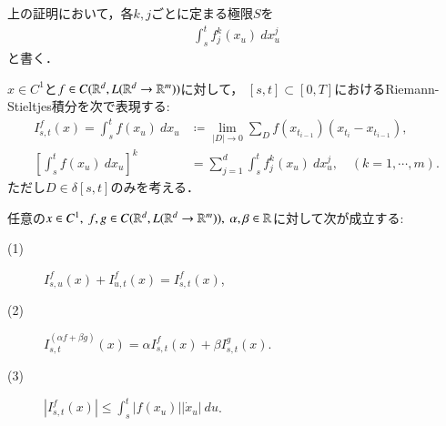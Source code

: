 上の証明において，各$k,j$ごとに定まる極限$S$を
\begin{align}
	\int_s^t f^k_j(x_u)\ dx^j_u
\end{align}
と書く．

\begin{screen}
	\begin{dfn}[$C^1$-級のパスに対する汎関数]
		$x \in C^1$と$f \in C(\mathbb{R}^d,L(\mathbb{R}^d \rightarrow \mathbb{R}^m))$に対して，
		$[s,t] \subset [0,T]$におけるRiemann-Stieltjes積分を次で表現する:
		\begin{align}
			I^f_{s,t}(x) = \int_s^t f(x_u)\ dx_u 
			&\coloneqq \lim_{|D| \to 0}
				\sum_{D} f(x_{t_{i-1}})(x_{t_i} - x_{t_{i-1}}), \\
			\left[ \int_s^t f(x_u)\ dx_u \right]^k
			&= \sum_{j=1}^d \int_s^t f^k_j(x_u)\ dx^j_u,
			\quad (k = 1,\cdots,m).
		\end{align}
		ただし$D \in \delta[s,t]$のみを考える．
	\end{dfn}
\end{screen}

\begin{screen}
	\begin{thm}
	\label{thm:linearity_of_Riemann_Stieltjes_integral}
		任意の$x \in C^1,\ f,g \in C(\mathbb{R}^d,L(\mathbb{R}^d \rightarrow \mathbb{R}^m)),\ \alpha,\beta \in \mathbb{R}$に対して次が成立する:
		\begin{description}
			\item[(1)] $I^f_{s,u}(x) + I^f_{u,t}(x) = I^f_{s,t}(x)$,
			
			\item[(2)] $I^{(\alpha f + \beta g)}_{s,t}(x) = \alpha I^f_{s,t}(x) + \beta I^g_{s,t}(x)$.
			
			\item[(3)] $\left| I^f_{s,t}(x) \right| \leq \int_s^t |f(x_u)| |\dot{x}_u|\ du$.
		\end{description}
	\end{thm}
\end{screen}

